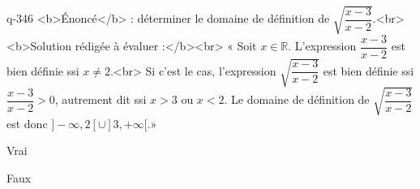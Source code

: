 \begin{truefalse}{q-346}
<b>Énoncé</b> : déterminer le domaine de définition de $\sqrt{\dfrac{x-3}{x-2}}$.<br> <b>Solution rédigée à évaluer :</b><br>  « Soit $x\in\mathbb{R}$. L'expression $\dfrac{x-3}{x-2}$ est bien définie ssi $x\neq 2$.<br> Si c'est le cas, l'expression $\sqrt{\dfrac{x-3}{x-2}}$ est bien définie ssi $\dfrac{x-3}{x-2}>0$, autrement dit ssi $x>3$ ou $x<2$. Le domaine de définition de $\sqrt{\dfrac{x-3}{x-2}}$ est donc $]-\infty,2[\cup ]3,+\infty[$.»
\item Vrai
\item* Faux
\end{truefalse}

